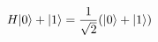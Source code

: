 \documentclass[preview]{standalone}
\begin{document}
\begin{align*}
\special{dvisvgm:raw <g id='unique000'>}H|0\rangle+|1\rangle=\frac{1}{\sqrt{2}}(|0\rangle+|1\rangle)\special{dvisvgm:raw </g>}
\end{align*}
\end{document}
